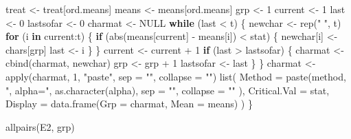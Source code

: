 \documentclass[
]{book}
\newenvironment{Shaded}{\begin{snugshade}}{\end{snugshade}}
\newcommand{\AttributeTok}[1]{\textcolor[rgb]{0.77,0.63,0.00}{#1}}
\newcommand{\ConstantTok}[1]{\textcolor[rgb]{0.00,0.00,0.00}{#1}}
\newcommand{\ControlFlowTok}[1]{\textcolor[rgb]{0.13,0.29,0.53}{\textbf{#1}}}
\newcommand{\DecValTok}[1]{\textcolor[rgb]{0.00,0.00,0.81}{#1}}
\newcommand{\FunctionTok}[1]{\textcolor[rgb]{0.00,0.00,0.00}{#1}}
\newcommand{\NormalTok}[1]{#1}
\newcommand{\OtherTok}[1]{\textcolor[rgb]{0.56,0.35,0.01}{#1}}
\newcommand{\SpecialCharTok}[1]{\textcolor[rgb]{0.00,0.00,0.00}{#1}}
\newcommand{\StringTok}[1]{\textcolor[rgb]{0.31,0.60,0.02}{#1}}
\begin{document}
\begin{Shaded}
\begin{Highlighting}[]
\NormalTok{  treat }\OtherTok{\textless{}{-}}\NormalTok{ treat[ord.means]}
\NormalTok{  means }\OtherTok{\textless{}{-}}\NormalTok{ means[ord.means]}
\NormalTok{  grp }\OtherTok{\textless{}{-}} \DecValTok{1}
\NormalTok{  current }\OtherTok{\textless{}{-}} \DecValTok{1}
\NormalTok{  last }\OtherTok{\textless{}{-}} \DecValTok{0}
\NormalTok{  lastsofar }\OtherTok{\textless{}{-}} \DecValTok{0}
\NormalTok{  charmat }\OtherTok{\textless{}{-}} \ConstantTok{NULL}
  \ControlFlowTok{while}\NormalTok{ (last }\SpecialCharTok{\textless{}}\NormalTok{ t) \{}
\NormalTok{    newchar }\OtherTok{\textless{}{-}} \FunctionTok{rep}\NormalTok{(}\StringTok{"  "}\NormalTok{, t)}
    \ControlFlowTok{for}\NormalTok{ (i }\ControlFlowTok{in}\NormalTok{ current}\SpecialCharTok{:}\NormalTok{t) \{}
      \ControlFlowTok{if}\NormalTok{ (}\FunctionTok{abs}\NormalTok{(means[current] }\SpecialCharTok{{-}}\NormalTok{ means[i]) }\SpecialCharTok{\textless{}}\NormalTok{ stat) \{}
\NormalTok{        newchar[i] }\OtherTok{\textless{}{-}}\NormalTok{ chars[grp]}
\NormalTok{        last }\OtherTok{\textless{}{-}}\NormalTok{ i}
\NormalTok{      \}}
\NormalTok{    \}}
\NormalTok{    current }\OtherTok{\textless{}{-}}\NormalTok{ current }\SpecialCharTok{+} \DecValTok{1}
    \ControlFlowTok{if}\NormalTok{ (last }\SpecialCharTok{\textgreater{}}\NormalTok{ lastsofar) \{}
\NormalTok{      charmat }\OtherTok{\textless{}{-}} \FunctionTok{cbind}\NormalTok{(charmat, newchar)}
\NormalTok{      grp }\OtherTok{\textless{}{-}}\NormalTok{ grp }\SpecialCharTok{+} \DecValTok{1}
\NormalTok{      lastsofar }\OtherTok{\textless{}{-}}\NormalTok{ last}
\NormalTok{    \}}
\NormalTok{  \}}
\NormalTok{  charmat }\OtherTok{\textless{}{-}} \FunctionTok{apply}\NormalTok{(charmat, }\DecValTok{1}\NormalTok{, }\StringTok{"paste"}\NormalTok{, }\AttributeTok{sep =} \StringTok{""}\NormalTok{, }\AttributeTok{collapse =} \StringTok{""}\NormalTok{)}
  \FunctionTok{list}\NormalTok{(}
    \AttributeTok{Method =} \FunctionTok{paste}\NormalTok{(method, }\StringTok{", alpha="}\NormalTok{, }\FunctionTok{as.character}\NormalTok{(alpha),}
      \AttributeTok{sep =} \StringTok{""}\NormalTok{, }\AttributeTok{collapse =} \StringTok{""}
\NormalTok{    ),}
    \AttributeTok{Critical.Val =}\NormalTok{ stat,}
    \AttributeTok{Display =} \FunctionTok{data.frame}\NormalTok{(}\AttributeTok{Grp =}\NormalTok{ charmat, }\AttributeTok{Mean =}\NormalTok{ means)}
\NormalTok{  )}
\NormalTok{\}}


\FunctionTok{allpairs}\NormalTok{(E2, grp)}
\end{Highlighting}
\end{Shaded}
\end{document}
